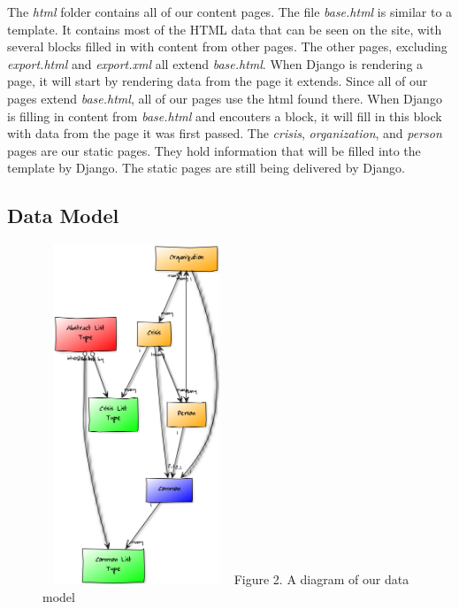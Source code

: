 \documentclass[12pt]{report}
\begin{document}
The \emph{html} folder contains all of our content pages.
The file \emph{base.html} is similar to a template.
It contains most of the HTML data that can be seen on the site, with several blocks filled in with content from other pages.
The other pages, excluding \emph{export.html} and \emph{export.xml} all extend \emph{base.html}.
When Django is rendering a page, it will start by rendering data from the page it extends.
Since all of our pages extend \emph{base.html}, all of our pages use the html found there.
When Django is filling in content from \emph{base.html} and encouters a block,
it will fill in this block with data from the page it was first passed.
The \emph{crisis}, \emph{organization}, and \emph{person} pages are our static pages.
They hold information that will be filled into the template by Django.
The static pages are still being delivered by Django.\\

\newpage
\subsection*{Data Model}
\hfill


\begin{figure}
\vspace{-20pt}
\begin{flushright}
\includegraphics*[width=0.5\textwidth,height=4in]{dataModelDiagram.png}
\newline
\footnotesize
Figure 2. A diagram of our data model %
\end{flushright}
\end{figure}
\normalsize
\end{document}
